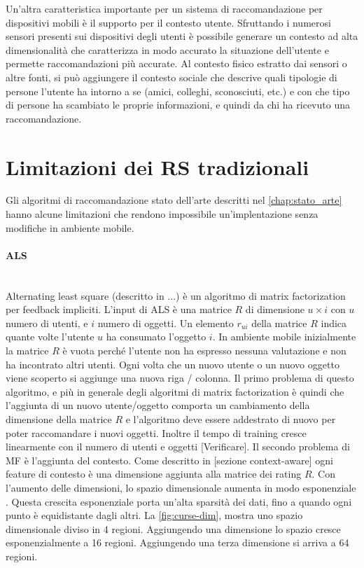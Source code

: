 \documentclass[12pt,italian]{report}
\newcommand{\myparagraph}[1]{\paragraph{#1}\mbox{}\\}
\begin{document}
Un'altra caratteristica importante per un sistema di raccomandazione per dispositivi mobili è il supporto per il contesto utente. Sfruttando i numerosi sensori presenti sui dispositivi degli utenti è possibile generare un contesto ad alta dimensionalità che caratterizza in modo accurato la situazione dell'utente e permette raccomandazioni più accurate. Al contesto fisico estratto dai sensori o altre fonti, si può aggiungere il contesto sociale che descrive quali tipologie di persone l'utente ha intorno a se (amici, colleghi, sconosciuti, etc.) e con che tipo di persone ha scambiato le proprie informazioni, e quindi da chi ha ricevuto una raccomandazione.

\section{Limitazioni dei RS tradizionali}
Gli algoritmi di raccomandazione stato dell'arte descritti nel \autoref{chap:stato_arte} hanno alcune limitazioni che rendono impossibile un'implentazione senza modifiche in ambiente mobile.

\myparagraph{ALS}
Alternating least square (descritto in ...) è un algoritmo di matrix factorization per feedback impliciti. L'input di ALS è una matrice $R$ di dimensione $u \times i$ con $u$ numero di utenti, e $i$ numero di oggetti. Un elemento $r_{ui}$ della matrice $R$ indica quante volte l'utente $u$ ha consumato l'oggetto $i$. In ambiente mobile inizialmente la matrice $R$ è vuota perché l'utente non ha espresso nessuna valutazione e non ha incontrato altri utenti. Ogni volta che un nuovo utente o un nuovo oggetto viene scoperto si aggiunge una nuova riga / colonna. Il primo problema di questo algoritmo, e più in generale degli algoritmi di matrix factorization è quindi che l'aggiunta di un nuovo utente/oggetto comporta un cambiamento della dimensione della matrice $R$ e l'algoritmo deve essere addestrato di nuovo per poter raccomandare i nuovi oggetti. Inoltre il tempo di training cresce linearmente con il numero di utenti e oggetti [Verificare]. Il secondo problema di MF è l'aggiunta del contesto. Come descritto in [sezione context-aware] ogni feature di contesto è una dimensione aggiunta alla matrice dei rating $R$. Con l'aumento delle dimensioni, lo spazio dimensionale aumenta in modo esponenziale \cite{curse-of-dim}. Questa crescita esponenziale porta un'alta sparsità dei dati, fino a quando ogni punto è equidistante dagli altri. La \autoref{fig:curse-dim}, mostra uno spazio dimensionale diviso in 4 regioni. Aggiungendo una dimensione lo spazio cresce esponenzialmente a 16 regioni. Aggiungendo una terza dimensione si arriva a 64 regioni.
\end{document}
